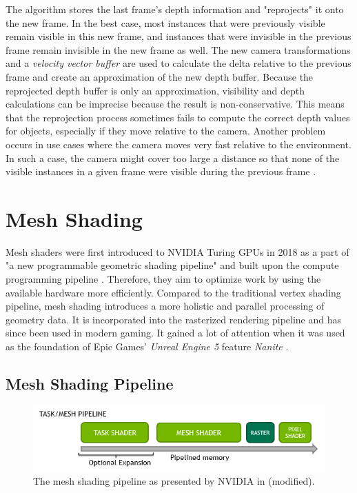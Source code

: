 \noindent
The algorithm stores the last frame's depth information and "reprojects" it onto the new frame. In the best case, 
most instances that were previously visible remain visible in this new frame, and instances that were invisible 
in the previous frame remain invisible in the new frame as well. The new camera transformations and a 
\emph{velocity vector buffer} are used to calculate the delta relative to the previous frame and create an 
approximation of the new depth buffer. Because the reprojected depth buffer is only an approximation, visibility 
and depth calculations can be imprecise because the result is non-conservative. This means that the reprojection 
process sometimes fails to compute the correct depth values for objects, especially if they move relative to the 
camera. Another problem occurs in use cases where the camera moves very fast relative to the environment. In such 
a case, the camera might cover too large a distance so that none of the visible instances in a given frame were 
visible during the previous frame \cite{Kruskonja2022}. \\

\section{Mesh Shading}  \label{sec-mesh-shading}

Mesh shaders were first introduced to NVIDIA Turing \ac{GPU}s in 2018 as a part of "a new programmable 
geometric shading pipeline" and built upon the compute programming pipeline \cite{Kubisch2018}. 
Therefore, they aim to optimize work by using the available hardware more efficiently. Compared to the 
traditional vertex shading pipeline, mesh shading introduces a more holistic and parallel processing of 
geometry data. It is incorporated into the rasterized rendering pipeline and has since been used in modern 
gaming. It gained a lot of attention when it was used as the foundation of Epic Games' \emph{Unreal Engine 5} 
feature \emph{Nanite} \cite{Karis2021}.\\


\subsection*{Mesh Shading Pipeline} \label{subsec-the-mesh-shading-pipeline}

\begin{figure}[h]
    \centering
    \includegraphics[width=\linewidth]{images/graphics/mesh-rendering-pipeline.jpg}
    \caption{The mesh shading pipeline as presented by NVIDIA in \cite{Kubisch2018} (modified).}
    \label{fig:mesh-rendering-pipeline}
\end{figure}

